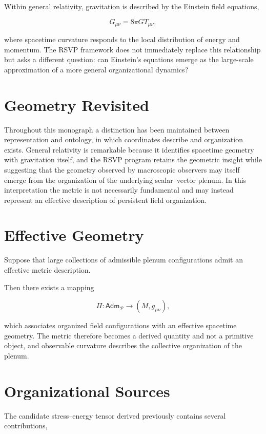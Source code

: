 \documentclass[11pt,oneside]{book}
\numberwithin{equation}{chapter}
\theoremstyle{definition}
\theoremstyle{plain}
\newcommand{\Adm}{\mathsf{Adm}}
\begin{document}
Within general relativity, gravitation is described by the Einstein field
equations,

\[
G_{\mu\nu}
=
8\pi G
T_{\mu\nu},
\]

where spacetime curvature responds to the local distribution of energy and momentum. The RSVP framework does not immediately replace this relationship but asks a different question: can Einstein's equations emerge as the large-scale approximation of a more general organizational dynamics?

\section{Geometry Revisited}

Throughout this monograph a distinction has been maintained between representation and ontology, in which coordinates describe and organization exists. General relativity is remarkable because it identifies spacetime geometry with gravitation itself, and the RSVP program retains the geometric insight while suggesting that the geometry observed by macroscopic observers may itself emerge from the organization of the underlying scalar--vector plenum. In this interpretation the metric is not necessarily fundamental and may instead represent an effective description of persistent field organization.

\section{Effective Geometry}

Suppose that large collections of admissible plenum configurations admit an
effective metric description.

Then there exists a mapping

\[
\Pi :
\Adm_{\mathcal P}
\longrightarrow
(M,g_{\mu\nu}),
\]

which associates organized field configurations with an effective spacetime geometry. The metric therefore becomes a derived quantity and not a primitive object, and observable curvature describes the collective organization of the plenum.

\section{Organizational Sources}

The candidate stress--energy tensor derived previously contains several
contributions,
\end{document}
